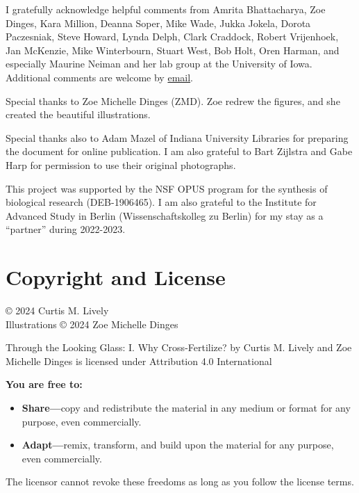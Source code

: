 \documentclass[
  letterpaper,
]{book}
\providecommand{\tightlist}{%
  \setlength{\itemsep}{0pt}\setlength{\parskip}{0pt}}\usepackage{longtable,booktabs,array}
\begin{document}
I gratefully acknowledge helpful comments from Amrita Bhattacharya, Zoe
Dinges, Kara Million, Deanna Soper, Mike Wade, Jukka Jokela, Dorota
Paczesniak, Steve Howard, Lynda Delph, Clark Craddock, Robert
Vrijenhoek, Jan McKenzie, Mike Winterbourn, Stuart West, Bob Holt, Oren
Harman, and especially Maurine Neiman and her lab group at the
University of Iowa. Additional comments are welcome by
\href{mailto:clively@indiana.edu}{email}.

Special thanks to Zoe Michelle Dinges (ZMD). Zoe redrew the figures, and
she created the beautiful illustrations.

Special thanks also to Adam Mazel of Indiana University Libraries for
preparing the document for online publication. I am also grateful to
Bart Zijlstra and Gabe Harp for permission to use their original
photographs.

This project was supported by the NSF OPUS program for the synthesis of
biological research (DEB-1906465). I am also grateful to the Institute
for Advanced Study in Berlin (Wissenschaftskolleg zu Berlin) for my stay
as a ``partner'' during 2022-2023.

\section*{Copyright and License}\label{copyright-and-license}


© 2024 Curtis M. Lively\\
Illustrations © 2024 Zoe Michelle Dinges

Through the Looking Glass: I. Why Cross-Fertilize? by {Curtis M. Lively
and Zoe Michelle Dinges} is licensed under Attribution 4.0 International

\textbf{You are free to:}

\begin{itemize}
\tightlist
\item
  \textbf{Share---}copy and redistribute the material in any medium or
  format for any purpose, even commercially.\\
\item
  \textbf{Adapt---}remix, transform, and build upon the material for any
  purpose, even commercially.
\end{itemize}

The licensor cannot revoke these freedoms as long as you follow the
license terms.
\end{document}
